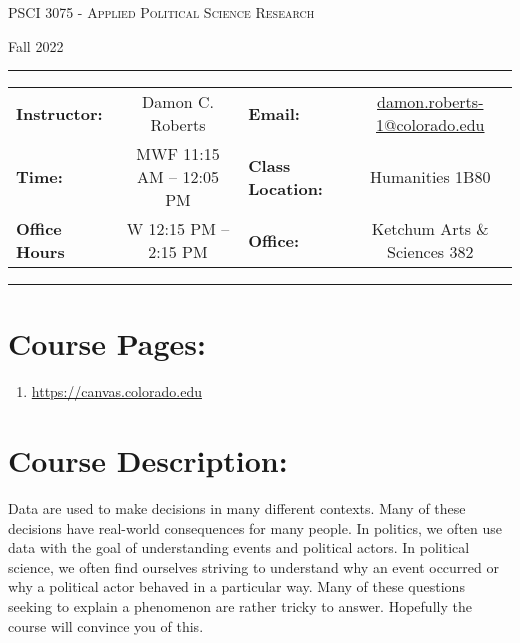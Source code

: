 \documentclass[11pt, a4paper]{article}
\begin{document}
\begin{center}
{\Large \textsc{PSCI 3075 - Applied Political Science Research}}
\end{center}
\begin{center}
Fall 2022
\end{center}

\begin{center}
\rule{6in}{0.4pt}
\begin{minipage}[t]{.75\textwidth}
\begin{tabular}{lclc}
\textbf{Instructor:} & Damon C. Roberts &\textbf{Email:} & \href{mailto:damon.roberts-1@colorado.edu}{damon.roberts-1@colorado.edu} \\
\textbf{Time:} &  MWF 11:15 AM -- 12:05 PM &\textbf{Class Location:} & Humanities 1B80 \\
\textbf{Office Hours} & W 12:15 PM -- 2:15 PM & \textbf{Office:} & Ketchum Arts \& Sciences 382
\end{tabular}
\end{minipage}
\rule{6in}{0.4pt}
\end{center}
\vspace{.5cm}
\setlength{\unitlength}{1in}
\renewcommand{\arraystretch}{2}

\section*{Course Pages:} \begin{enumerate}
\item \url{https://canvas.colorado.edu}
\end{enumerate}


\section*{Course Description:} 

Data are used to make decisions in many different contexts. Many of these decisions have real-world consequences for many people. In politics, we often use data with the goal of understanding events and political actors. In political science, we often find ourselves striving to understand why an event occurred or why a political actor behaved in a particular way. Many of these questions seeking to explain a phenomenon are rather tricky to answer. Hopefully the course will convince you of this.
\end{document}
